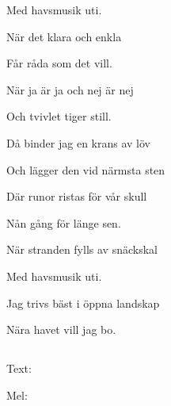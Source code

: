Med havsmusik uti.

När det klara och enkla

Får råda som det vill.

När ja är ja och nej är nej

Och tvivlet tiger still.

Då binder jag en krans av löv

Och lägger den vid närmsta sten

Där runor ristas för vår skull

Nån gång för länge sen.

När stranden fylls av snäckskal

Med havsmusik uti.

Jag trivs bäst i öppna landskap

Nära havet vill jag bo. 


\subsection{\textbf{}}

Text: 

Mel: \bigskip

\newpage